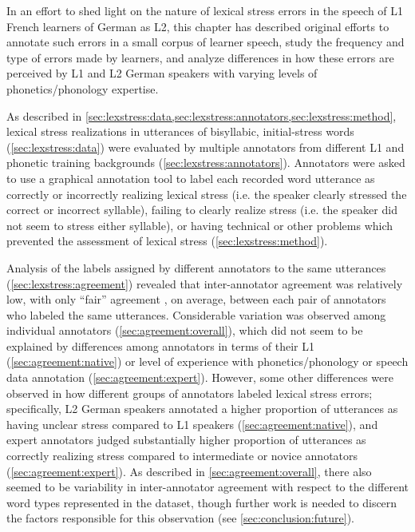 	In an effort to shed light on the nature of lexical stress errors in the speech of L1 French learners of German as L2, this chapter has described original efforts to 
	annotate such errors in a small corpus of learner speech, 
	study the frequency and type of errors made by learners,
	and analyze differences in how these errors are perceived by L1 and L2 German speakers with varying levels of phonetics/phonology expertise.
	
	As described in \cref{sec:lexstress:data,sec:lexstress:annotators,sec:lexstress:method},
	lexical stress realizations in utterances of bisyllabic, initial-stress words (\cref{sec:lexstress:data})
	were evaluated by multiple annotators from different L1 and phonetic training backgrounds (\cref{sec:lexstress:annotators}).
	Annotators were asked to use a graphical annotation tool to label each recorded word utterance
	as correctly or incorrectly realizing lexical stress (i.e. the speaker clearly stressed the correct or incorrect syllable), failing to clearly realize stress (i.e. the speaker did not seem to stress either syllable), or having technical or other problems which prevented the assessment of lexical stress (\cref{sec:lexstress:method}). 
	
	
	
	Analysis of the labels assigned by different annotators to the same utterances (\cref{sec:lexstress:agreement}) revealed that inter-annotator agreement was relatively low, with only ``fair'' agreement \citep{Landis1977}, on average, between each pair of annotators who labeled the same utterances. Considerable variation was observed among individual annotators (\cref{sec:agreement:overall}), which did not seem to be explained by differences among annotators in terms of their L1 (\cref{sec:agreement:native}) or level of experience with phonetics/phonology or speech data annotation (\cref{sec:agreement:expert}).  
	However, some other differences were observed in how different groups of annotators labeled lexical stress errors; specifically, L2 German speakers annotated a higher proportion of utterances as having unclear stress compared to L1 speakers (\cref{sec:agreement:native}), and expert annotators judged substantially higher proportion of utterances as correctly realizing stress compared to intermediate or novice annotators (\cref{sec:agreement:expert}).
	As described in \cref{sec:agreement:overall}, there also seemed to be variability in inter-annotator agreement with respect to the different word types represented in the dataset, though further work is needed to discern the factors responsible for this observation (see \cref{sec:conclusion:future}).
	
